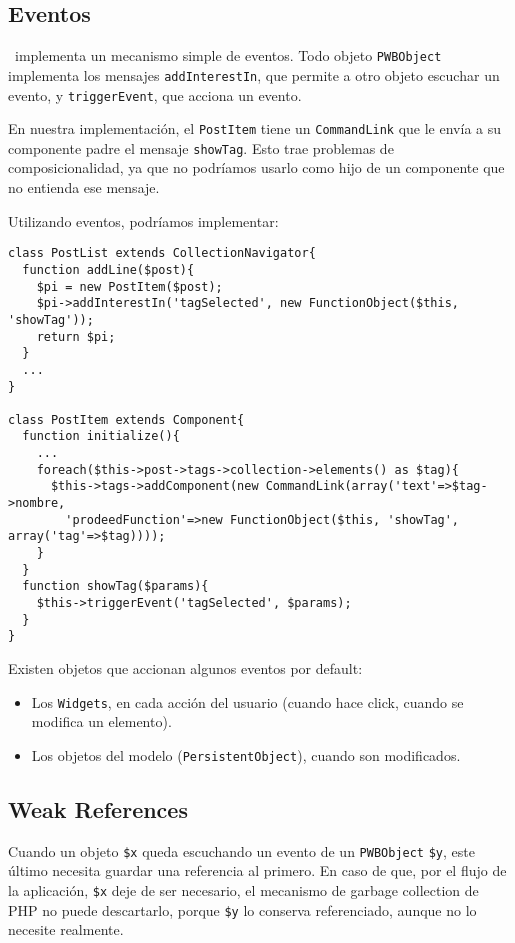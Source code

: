 
\subsection{Eventos}
\label{sub-events}
\PWB \ implementa un mecanismo simple de eventos. Todo objeto \verb"PWBObject" implementa los mensajes \verb"addInterestIn", que permite a otro objeto escuchar un evento, y \verb"triggerEvent", que acciona un evento.

En nuestra implementación, el \verb"PostItem" tiene un \verb"CommandLink" que le envía a su componente padre el mensaje \verb"showTag". Esto trae problemas de composicionalidad, ya que no podríamos usarlo como hijo de un componente que no entienda ese mensaje.

Utilizando eventos, podríamos implementar:

\begin{verbatim}
class PostList extends CollectionNavigator{
  function addLine($post){
    $pi = new PostItem($post);
    $pi->addInterestIn('tagSelected', new FunctionObject($this, 'showTag'));
    return $pi;
  }
  ...
}

class PostItem extends Component{
  function initialize(){
    ...
    foreach($this->post->tags->collection->elements() as $tag){
      $this->tags->addComponent(new CommandLink(array('text'=>$tag->nombre,
        'prodeedFunction'=>new FunctionObject($this, 'showTag', array('tag'=>$tag))));
    }
  }
  function showTag($params){
    $this->triggerEvent('tagSelected', $params);
  }
}

\end{verbatim}

Existen objetos que accionan algunos eventos por default:
\begin{itemize}
\item Los \verb"Widgets", en cada acción del usuario (cuando hace click, cuando se modifica un elemento).
\item Los objetos del modelo (\verb"PersistentObject"), cuando son modificados.
\end{itemize}

\subsection{Weak References}
\label{sub-weak}
Cuando un objeto \verb"$x" queda escuchando un evento de un \verb"PWBObject" \verb"$y", este último necesita guardar una referencia al primero. En caso de que, por el flujo de la aplicación, \verb'$x' deje de ser necesario, el mecanismo de garbage collection de PHP no puede descartarlo, porque \verb'$y' lo conserva referenciado, aunque no lo necesite realmente.

